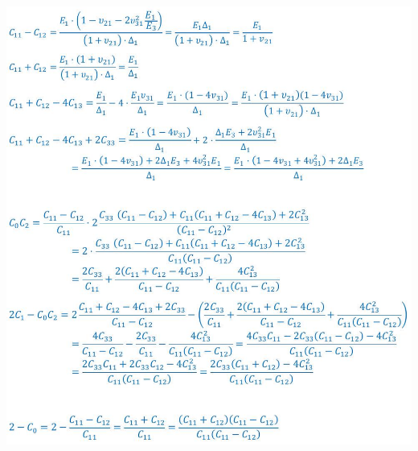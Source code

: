 \documentclass[10pt]{article}
\begin{document}
\includegraphics[max width=\textwidth]{2021_11_05---cohen-proof-of-lim-rahul-variable-manipulation}
\end{document}
